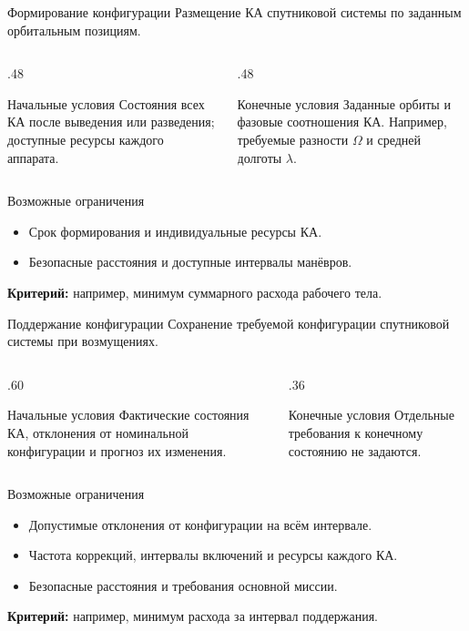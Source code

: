 \documentclass[11pt,aspectratio=169,t]{beamer}
\begin{document}
\begin{frame}{Формирование конфигурации}
Размещение КА спутниковой системы по заданным орбитальным позициям.
\begin{columns}[T,onlytextwidth]
\begin{column}{.48\textwidth}
\begin{block}{Начальные условия}
\justifying
Состояния всех КА после выведения или разведения; доступные ресурсы каждого аппарата.
\end{block}
\end{column}
\begin{column}{.48\textwidth}
\begin{block}{Конечные условия}
\justifying
Заданные орбиты и фазовые соотношения КА. Например, требуемые разности $\Omega$ и средней долготы $\lambda$.
\end{block}
\end{column}
\end{columns}
\begin{block}{Возможные ограничения}
\begin{itemize}
\item Срок формирования и индивидуальные ресурсы КА.
\item Безопасные расстояния и доступные интервалы манёвров.
\end{itemize}
\end{block}
\textbf{Критерий:} например, минимум суммарного расхода рабочего тела.
\end{frame}

\begin{frame}{Поддержание конфигурации}
Сохранение требуемой конфигурации спутниковой системы при возмущениях.
\begin{columns}[T,onlytextwidth]
\begin{column}{.60\textwidth}
\begin{block}{Начальные условия}
\justifying
Фактические состояния КА, отклонения от номинальной конфигурации и прогноз их изменения.
\end{block}
\end{column}
\begin{column}{.36\textwidth}
\begin{block}{Конечные условия}
\justifying
Отдельные требования к конечному состоянию не задаются.
\end{block}
\end{column}
\end{columns}
\begin{block}{Возможные ограничения}
\begin{itemize}
\setlength{\itemsep}{0pt}
\item Допустимые отклонения от конфигурации на всём интервале.
\item Частота коррекций, интервалы включений и ресурсы каждого КА.
\item Безопасные расстояния и требования основной миссии.
\end{itemize}
\end{block}
\textbf{Критерий:} например, минимум расхода за интервал поддержания.
\end{frame}
\end{document}
